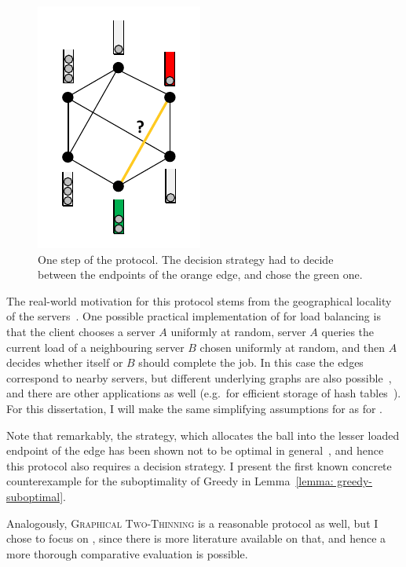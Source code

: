 \begin{figure}[hbt!] \label{graphical-two-choice-intro}
    \centering
    \includegraphics[scale=1.5]{Chapter2/Figs/graphical_two_choice_intro.pdf}
    \caption{One step of the \GraphicalTwoChoice protocol. The decision strategy had to decide between the endpoints of the orange edge, and chose the green one.}
\end{figure}

The real-world motivation for this protocol stems from the geographical locality of the servers~\cite{krishnaram2006graphicaltwochoiceoriginal}. One possible practical implementation of \GraphicalTwoChoice for load balancing is that the client chooses a server $A$ uniformly at random, server $A$ queries the current load of a neighbouring server $B$ chosen uniformly at random, and then $A$ decides whether itself or $B$ should complete the job. In this case the edges correspond to nearby servers, but different underlying graphs are also possible~\cite{peres2015oneplusbeta}, and there are other applications as well (e.g.\ for efficient storage of hash tables~\cite{krishnaram2006graphicaltwochoiceoriginal}). For this dissertation, I will make the same simplifying assumptions for \GraphicalTwoChoice as for \TwoThinning.


Note that remarkably, the \Greedy strategy, which allocates the ball into the lesser loaded endpoint of the edge has been shown not to be optimal in general~\cite{bansal2021twochoicegraphical}, and hence this protocol also requires a decision strategy. I present the first known concrete counterexample for the suboptimality of Greedy in Lemma~\ref{lemma: greedy-suboptimal}.


Analogously, \textsc{Graphical Two-Thinning} is a reasonable protocol as well, but I chose to focus on \GraphicalTwoChoice, since there is more literature available on that, and hence a more thorough comparative evaluation is possible.\\


